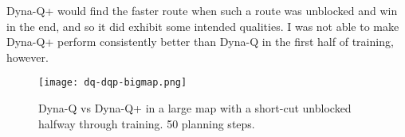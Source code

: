 \documentclass{article}
\begin{document}
Dyna-Q+ would find the faster route when such a route was unblocked and win in the end, and so it did exhibit some intended qualities. I was not able to make Dyna-Q+ perform consistently better than Dyna-Q in the first half of training, however. 

\begin{figure}[H]
    \centering
        \texttt{[image: dq-dqp-bigmap.png]}
    \caption{Dyna-Q vs Dyna-Q+ in a large map with a short-cut unblocked halfway through training. 50 planning steps.}
    \label{}
\end{figure}



\end{document}

